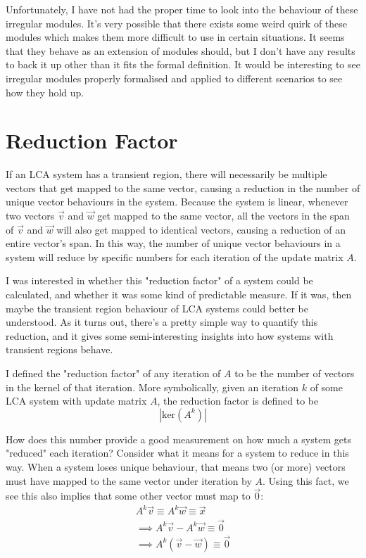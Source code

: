 \documentclass[a4paper, 12pt, reqno]{amsart}
\newcommand{\ssection}[1]{\vspace{1cm}\section{#1}}
\begin{document}
		Unfortunately, I have not had the proper time to look into the behaviour of these irregular modules.
		It's very possible that there exists some weird quirk of these modules which makes them more difficult
		to use in certain situations. It seems that they behave as an extension of modules should, but I don't
		have any results to back it up other than it fits the formal definition. It would be interesting to see
		irregular modules properly formalised and applied to different scenarios to see how they hold up.
		
	\ssection{Reduction Factor}
		If an LCA system has a transient region, there will necessarily be multiple vectors that get mapped
		to the same vector, causing a reduction in the number of unique vector behaviours in the system. Because 
		the system is linear, whenever two vectors $\vec{v}$ and $\vec{w}$ get mapped to the same vector, all the 
		vectors in the span of $\vec{v}$ and $\vec{w}$ will also get mapped to identical vectors, causing a 
		reduction of an entire vector's span. In this way, the number of unique vector behaviours in a system
		will reduce by specific numbers for each iteration of the update matrix $A$.
		
		I was interested in whether this "reduction factor" of a system could be calculated, and whether it was
		some kind of predictable measure. If it was, then maybe the transient region behaviour of LCA systems
		could better be understood. As it turns out, there's a pretty simple way to quantify this reduction,
		and it gives some semi-interesting insights into how systems with transient regions behave.
		
		I defined the "reduction factor" of any iteration of $A$ to be the number of vectors in the kernel of
		that iteration. More symbolically, given an iteration $k$ of some LCA system with update matrix $A$, the
		reduction factor is defined to be
		\[
			|\text{ker}(A^k)|
		\]
		
		How does this number provide a good measurement on how much a system gets "reduced" each iteration?
		Consider what it means for a system to reduce in this way. When a system loses unique behaviour, that
		means two (or more) vectors must have mapped to the same vector under iteration by $A$. Using this fact,
		we see this also implies that some other vector must map to $\vec{0}$:
		\begin{align*}
			A^{k}\vec{v} \equiv A^{k}\vec{w}      \equiv \vec{x} \\
			\implies A^{k}\vec{v} - A^{k}\vec{w}  \equiv \vec{0} \\
			\implies A^{k}(\vec{v} - \vec{w})     \equiv \vec{0} \\
		\end{align*}
		
\end{document}

